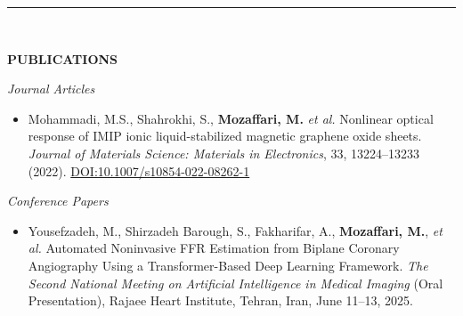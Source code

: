 \documentclass[12pt, b4paper]{cv}
\begin{document}



	


\vspace{-0.15in}
\rule{\textwidth}{1pt}\\
\vspace{-0.15in}

{\Large \textbf{PUBLICATIONS}}
\vspace{5pt}

\textit{Journal Articles}
\begin{itemize}[leftmargin=*]
\item Mohammadi, M.S., Shahrokhi, S., \textbf{Mozaffari, M.} \textit{et al.}
    Nonlinear optical response of IMIP ionic liquid-stabilized magnetic graphene oxide sheets.
    \textit{Journal of Materials Science: Materials in Electronics}, 33, 13224–13233 (2022).
    \href{https://doi.org/10.1007/s10854-022-08262-1}{DOI:10.1007/s10854-022-08262-1}

\end{itemize}

\textit{Conference Papers}
\begin{itemize}[leftmargin=*]
    \item Yousefzadeh, M., Shirzadeh Barough, S., Fakharifar, A., \textbf{Mozaffari, M.}, \textit{et al.}
    Automated Noninvasive FFR Estimation from Biplane Coronary Angiography Using a Transformer-Based Deep Learning Framework.
    \textit{The Second National Meeting on Artificial Intelligence in Medical Imaging} (Oral Presentation), Rajaee Heart Institute, Tehran, Iran, June 11–13, 2025.
\end{itemize}
\end{document}

